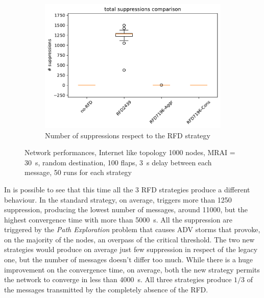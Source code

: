 \begin{figure}[h]
\begin{subfigure}[b]{0.49\textwidth}
     \end{subfigure}
     \begin{subfigure}[b]{0.49\textwidth}
         \centering
         \includegraphics[width=\textwidth]{images/RFD/miceVSelephants/elephants/cisco_1000MRAI30_rfd_comparison_suppressions_boxplot.pdf}
         \caption{Number of suppressions respect to the RFD strategy}
         \label{fig:1000_RFD_MRAI_30_suppressions_elephant}
     \end{subfigure}
		\caption{Network performances, Internet like topology \num{1000} nodes, \ac{MRAI} = \SI{30}{\second},
		random destination, \num{100} flaps, \SI{3}{\second} delay between each
		message, \num{50} runs for each strategy}
        \label{fig:1000_RFD_MRAI_30_elephant}
\end{figure}

In  is possible to see that this time
all the \num{3} \ac{RFD} strategies produce a different behaviour.
In 
the standard strategy, on average, triggers more than \num{1250} suppression, producing
the lowest number of messages, around \num{11000}, but the highest convergence
time with more than \SI{5000}{\second}.
All the suppression are triggered by the \textit{Path Exploration} problem that
causes \ac{ADV} storms that provoke, on the majority of the nodes, an overpass
of the critical threshold.
The two new strategies would produce on average just few suppression in respect
of the legacy one, but the number of messages doesn't differ too much.
While there is a huge improvement on the convergence time, on average,
both the new strategy permits the network to converge in less than \SI{4000}{\second}.
All three strategies produce $1/3$ of the messages transmitted by the completely
absence of the \ac{RFD}.

